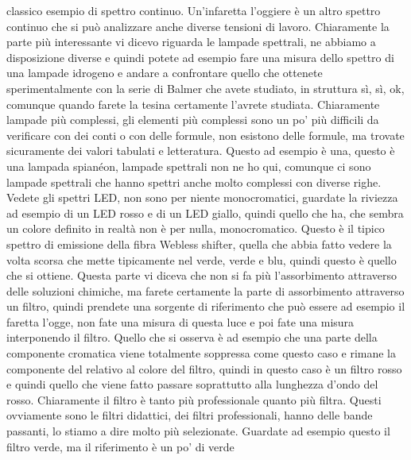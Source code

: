 {classico esempio di spettro continuo. Un'infaretta l'oggiere è un altro spettro continuo che si può analizzare anche diverse tensioni di lavoro. Chiaramente la parte più interessante vi dicevo riguarda le lampade spettrali, ne abbiamo a disposizione diverse e quindi potete ad esempio fare una misura dello spettro di una lampade idrogeno e andare a confrontare quello che ottenete sperimentalmente con la serie di Balmer che avete studiato, in struttura sì, sì, ok, comunque quando farete la tesina certamente l'avrete studiata. Chiaramente lampade più complessi, gli elementi più complessi sono un po' più difficili da verificare con dei conti o con delle formule, non esistono delle formule, ma trovate sicuramente dei valori tabulati e letteratura. Questo ad esempio è una, questo è una lampada spianéon, lampade spettrali non ne ho qui, comunque ci sono lampade spettrali che hanno spettri anche molto complessi con diverse righe. Vedete gli spettri LED, non sono per niente monocromatici, guardate la riviezza ad esempio di un LED rosso e di un LED giallo, quindi quello che ha, che sembra un colore definito in realtà non è per nulla, monocromatico. Questo è il tipico spettro di emissione della fibra Webless shifter, quella che abbia fatto vedere la volta scorsa che mette tipicamente nel verde, verde e blu, quindi questo è quello che si ottiene. Questa parte vi diceva che non si fa più l'assorbimento attraverso delle soluzioni chimiche, ma farete certamente la parte di assorbimento attraverso un filtro, quindi prendete una sorgente di riferimento che può essere ad esempio il faretta l'ogge, non fate una misura di questa luce e poi fate una misura interponendo il filtro. Quello che si osserva è ad esempio che una parte della componente cromatica viene totalmente soppressa come questo caso e rimane la componente del relativo al colore del filtro, quindi in questo caso è un filtro rosso e quindi quello che viene fatto passare soprattutto alla lunghezza d'ondo del rosso. Chiaramente il filtro è tanto più professionale quanto più filtra. Questi ovviamente sono le filtri didattici, dei filtri professionali, hanno delle bande passanti, lo stiamo a dire molto più selezionate. Guardate ad esempio questo il filtro verde, ma il riferimento è un po' di verde 

}
